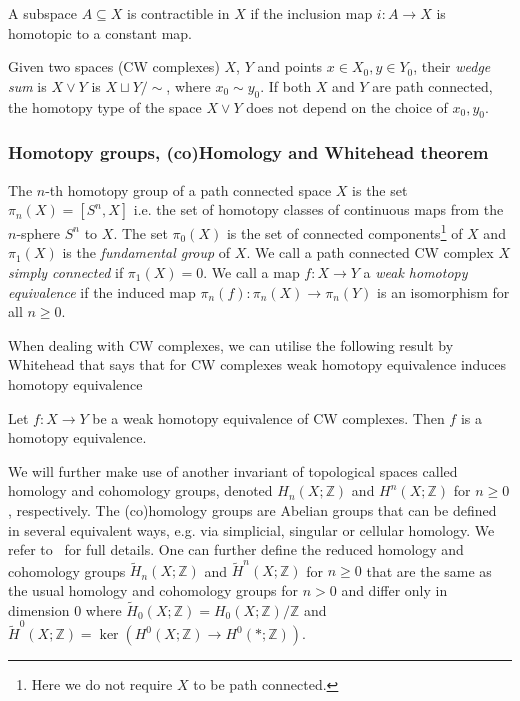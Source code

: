 \documentclass[a4paper, v2021]{lipics-v2021}
\theoremstyle{plain}
\theoremstyle{definition}
\begin{document}
A subspace $A\subseteq X$ is contractible in $X$ if the inclusion map $i\colon A \to X$ is homotopic to a constant map.

Given two spaces (CW complexes) $X$, $Y$ and points $x\in X_0, y\in Y_0$, their \emph{wedge sum} is $X \vee Y$ is $X\sqcup Y/\sim$, where $x_0\sim y_0$. If both $X$ and $Y$ are path connected, the homotopy type of the space $X \vee Y$ does not depend on the choice of $x_0, y_0$.


\subsubsection*{Homotopy groups, (co)Homology and Whitehead theorem}

The $n$-th homotopy group of a path connected space $X$ is the set $\pi_n(X) = [S^n, X]$ i.e. the set of homotopy classes of continuous maps from the $n$-sphere $S^n$ to $X$. The set $\pi_0(X)$ is the set of connected components\footnote{Here we do not require $X$ to be path connected.} of $X$ and $\pi_1(X)$ is the \emph{fundamental group} of $X$. We call a path connected CW complex $X$ \emph{simply connected} if $\pi_1(X) = 0$. We call a map $f\colon X \to Y$ a \emph{weak homotopy equivalence} if the induced map $\pi_n(f)\colon \pi_n(X) \to \pi_n(Y)$ is an isomorphism for all $n\geq 0$.

When dealing with CW complexes, we can utilise the following result by Whitehead that says that for CW complexes weak homotopy equivalence induces homotopy equivalence 
\begin{theorem}
    Let $f\colon X \to Y$ be a weak homotopy equivalence of CW complexes. Then $f$ is a homotopy equivalence.
\end{theorem}

We will further make use of another invariant of topological spaces called homology and cohomology groups, denoted $H_n(X; \mathbb{Z})$ and $H^n(X; \mathbb{Z})$ for $n\geq 0$, respectively.
The (co)homology groups are Abelian groups that can be defined in several equivalent ways, e.g. via simplicial, singular or cellular homology. We refer to~\cite[Chapter~2]{Hatcher2002} for full details. One can further define the reduced homology and cohomology groups $\tilde{H}_n(X; \mathbb{Z})$ and $\tilde{H}^n(X; \mathbb{Z})$ for $n\geq 0$ that are the same as the usual homology and cohomology groups for $n>0$ and differ only in dimension $0$ where $\tilde{H}_0(X; \mathbb{Z}) = H_0(X; \mathbb{Z})/\mathbb{Z}$ and $\tilde{H}^0(X; \mathbb{Z}) = \ker(H^0(X; \mathbb{Z}) \to H^0(*; \mathbb{Z}))$.
\end{document}
